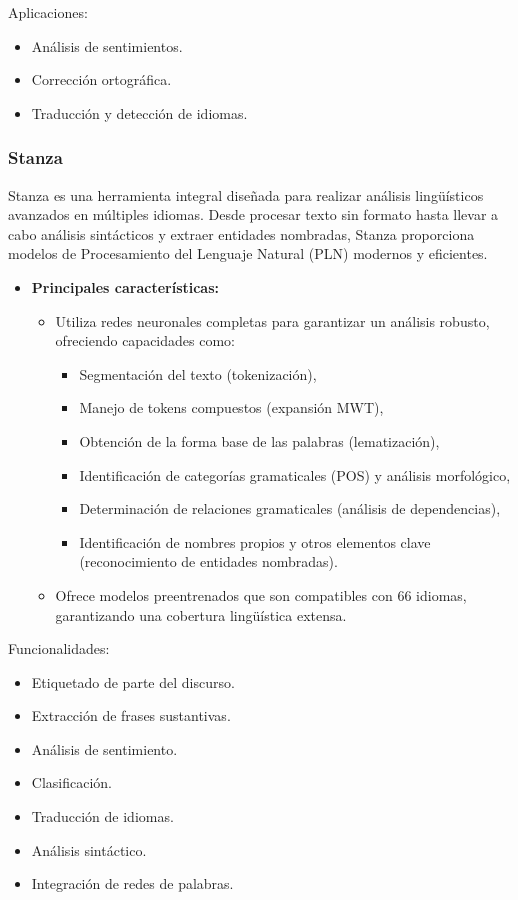 \documentclass{report}
\begin{document}
Aplicaciones:

\begin{itemize}
    \item Análisis de sentimientos.
    \item Corrección ortográfica.
    \item Traducción y detección de idiomas.
\end{itemize}

\subsubsection{Stanza}
Stanza es una herramienta integral diseñada para realizar análisis lingüísticos avanzados en múltiples idiomas. 
Desde procesar texto sin formato hasta llevar a cabo análisis sintácticos y extraer entidades nombradas, 
Stanza proporciona modelos de Procesamiento del Lenguaje Natural (PLN) modernos y eficientes.

\begin{itemize}
    \item \textbf{Principales características:}
    \begin{itemize}
        \item Utiliza redes neuronales completas para garantizar un análisis robusto, ofreciendo capacidades como:
        \begin{itemize}
            \item Segmentación del texto (tokenización),
            \item Manejo de tokens compuestos (expansión MWT),
            \item Obtención de la forma base de las palabras (lematización),
            \item Identificación de categorías gramaticales (POS) y análisis morfológico,
            \item Determinación de relaciones gramaticales (análisis de dependencias),
            \item Identificación de nombres propios y otros elementos clave (reconocimiento de entidades nombradas).
        \end{itemize}
        \item Ofrece modelos preentrenados que son compatibles con 66 idiomas, garantizando una cobertura lingüística extensa.
    \end{itemize}
\end{itemize}


Funcionalidades:

\begin{itemize}
    \item Etiquetado de parte del discurso.
    \item Extracción de frases sustantivas.
    \item Análisis de sentimiento.
    \item Clasificación.
    \item Traducción de idiomas.
    \item Análisis sintáctico.
    \item Integración de redes de palabras.
\end{itemize}
\end{document}
